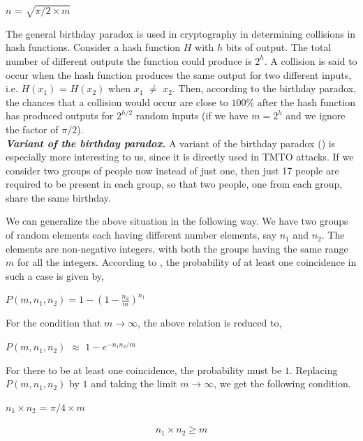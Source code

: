 \begin{center}
$n$ = $\sqrt{\pi/2 \times m}$
\end{center}

The general birthday paradox is used in cryptography in determining collisions in hash functions. Consider a hash function $H$ with $h$ bits of output. The total number of different outputs the function could produce is $2^{h}$. A collision is said to occur when the hash function produces the same output for two different inputs, i.e. $H(x_1)$ = $H(x_2)$ when $x_1$ $\neq$ $x_2$. Then, according to the birthday paradox, the chances that a collision would occur are close to $100 \%$ after the hash function has produced outputs for $2^{h/2}$ random inputs (if we have $m = 2^h$ and we ignore the factor of $\pi/2$).\\

\indent \textit{\textbf{Variant of the birthday paradox.}} A variant of the birthday paradox (\cite{GeneralizedAttack}) is especially more interesting to us, since it is directly used in TMTO attacks. If we consider two groups of people now instead of just one, then just 17 people are required to be present in each group, so that two people, one from each group, share the same birthday.  

We can generalize the above situation in the following way. We have two groups of random elements each having different number elements, say $n_1$ and $n_2$. The elements are non-negative integers, with both the groups having the same range $m$ for all the integers. According to \cite{menezes}, the probability of at least one coincidence in such a case is given by,
\begin{center}
$P(m, n_1, n_2) = 1 -(1 -\frac{n_2}{m})^{n_1}$
\end{center}

For the condition that $m \rightarrow \infty$, the above relation is reduced to,
\begin{center}
$P(m, n_1, n_2)$ $\approx$ $1 - e^{-{n_{1} n_{2}}/{m}}$
\end{center}

For there to be at least one coincidence, the probability must be $1$. Replacing $P(m, n_1, n_2)$ by $1$ and taking the limit $m \rightarrow \infty$, we get the following condition.
\begin{center}
$n_1 \times n_2$ = $\pi/4 \times m$
\end{center}

\begin{align}
\label{eq:bday-paradox2} n_1 \times n_2 \geq m
\end{align}

